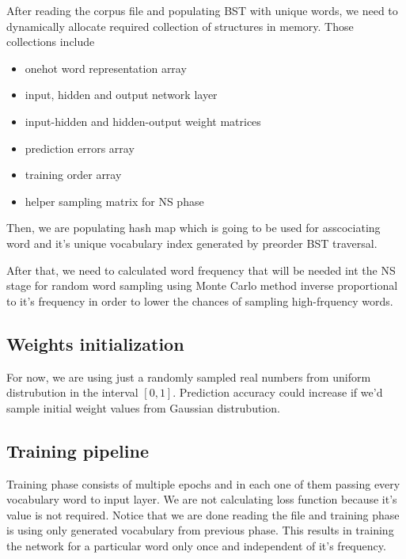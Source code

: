 \documentclass{article}
\begin{document}
\medbreak

After reading the corpus file and populating BST with unique words, we need to
dynamically allocate required collection of structures in memory. Those
collections include

\begin{itemize}
	\item onehot word representation array
	\item input, hidden and output network layer
	\item input-hidden and hidden-output weight matrices
	\item prediction errors array
	\item training order array
	\item helper sampling matrix for NS phase
\end{itemize}

\medbreak

Then, we are populating hash map which is going to be used for asscociating
word and it's unique vocabulary index generated by preorder BST traversal.

\medbreak

After that, we need to calculated word frequency that will be needed
int the NS stage for random word sampling using Monte Carlo method inverse
proportional to it's frequency in order to lower the chances of sampling
high-frquency words.

\subsection{Weights initialization}

For now, we are using just a randomly sampled real numbers from uniform distrubution in the interval
$[0, 1]$. Prediction accuracy could increase if we'd sample initial weight values from Gaussian
distrubution.

\subsection{Training pipeline}

Training phase consists of multiple epochs and in each one of them passing
every vocabulary word to input layer. We are not calculating loss function
because it's value is not required. Notice that we are done reading the file
and training phase is using only generated vocabulary from previous phase.
This results in training the network for a particular word only once and
independent of it's frequency.
\end{document}
